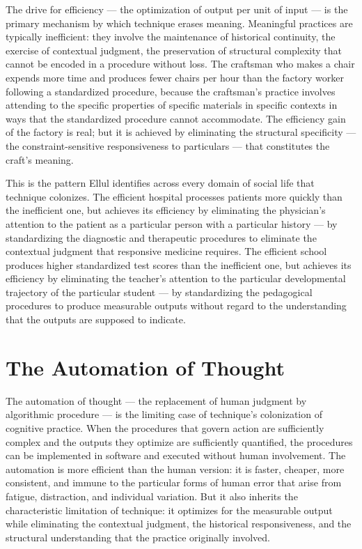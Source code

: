 \documentclass[12pt,openany]{book}
\theoremstyle{plain}
\theoremstyle{definition}
\theoremstyle{remark}
\begin{document}
The drive for efficiency — the optimization of output per unit of input — is the primary mechanism by which technique erases meaning. Meaningful practices are typically inefficient: they involve the maintenance of historical continuity, the exercise of contextual judgment, the preservation of structural complexity that cannot be encoded in a procedure without loss. The craftsman who makes a chair expends more time and produces fewer chairs per hour than the factory worker following a standardized procedure, because the craftsman's practice involves attending to the specific properties of specific materials in specific contexts in ways that the standardized procedure cannot accommodate. The efficiency gain of the factory is real; but it is achieved by eliminating the structural specificity — the constraint-sensitive responsiveness to particulars — that constitutes the craft's meaning.

This is the pattern Ellul identifies across every domain of social life that technique colonizes. The efficient hospital processes patients more quickly than the inefficient one, but achieves its efficiency by eliminating the physician's attention to the patient as a particular person with a particular history — by standardizing the diagnostic and therapeutic procedures to eliminate the contextual judgment that responsive medicine requires. The efficient school produces higher standardized test scores than the inefficient one, but achieves its efficiency by eliminating the teacher's attention to the particular developmental trajectory of the particular student — by standardizing the pedagogical procedures to produce measurable outputs without regard to the understanding that the outputs are supposed to indicate.

\section{The Automation of Thought}

The automation of thought — the replacement of human judgment by algorithmic procedure — is the limiting case of technique's colonization of cognitive practice. When the procedures that govern action are sufficiently complex and the outputs they optimize are sufficiently quantified, the procedures can be implemented in software and executed without human involvement. The automation is more efficient than the human version: it is faster, cheaper, more consistent, and immune to the particular forms of human error that arise from fatigue, distraction, and individual variation. But it also inherits the characteristic limitation of technique: it optimizes for the measurable output while eliminating the contextual judgment, the historical responsiveness, and the structural understanding that the practice originally involved.
\end{document}
